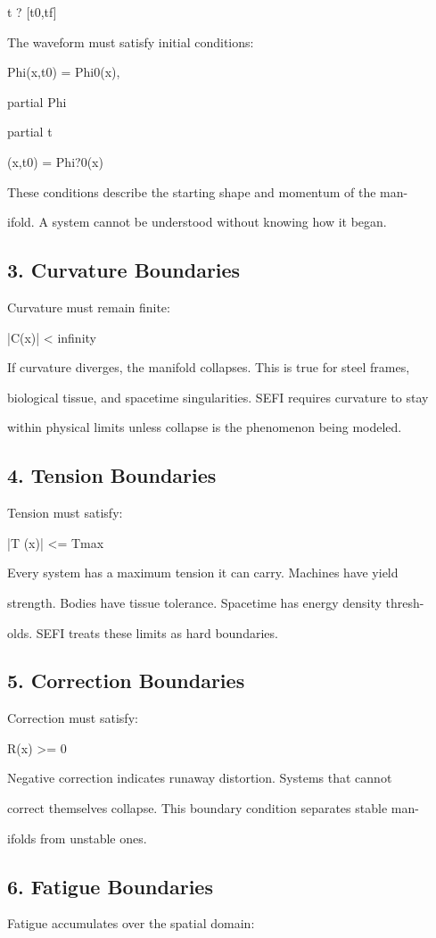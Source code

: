 \documentclass[10pt]{article}
\begin{document}
t ? [t0,tf]

The waveform must satisfy initial conditions:

Phi(x,t0) = Phi0(x),

partial Phi

partial t

(x,t0) = Phi?0(x)

These conditions describe the starting shape and momentum of the man-

ifold. A system cannot be understood without knowing how it began.

\subsection*{3. Curvature Boundaries}
Curvature must remain finite:

|C(x)| < infinity

If curvature diverges, the manifold collapses. This is true for steel frames,

biological tissue, and spacetime singularities. SEFI requires curvature to stay

within physical limits unless collapse is the phenomenon being modeled.

\subsection*{4. Tension Boundaries}
Tension must satisfy:

|T (x)| <= Tmax

Every system has a maximum tension it can carry. Machines have yield

strength. Bodies have tissue tolerance. Spacetime has energy density thresh-

olds. SEFI treats these limits as hard boundaries.

\subsection*{5. Correction Boundaries}
Correction must satisfy:

R(x) >= 0

Negative correction indicates runaway distortion. Systems that cannot

correct themselves collapse. This boundary condition separates stable man-

ifolds from unstable ones.


\subsection*{6. Fatigue Boundaries}
Fatigue accumulates over the spatial domain:
\end{document}
